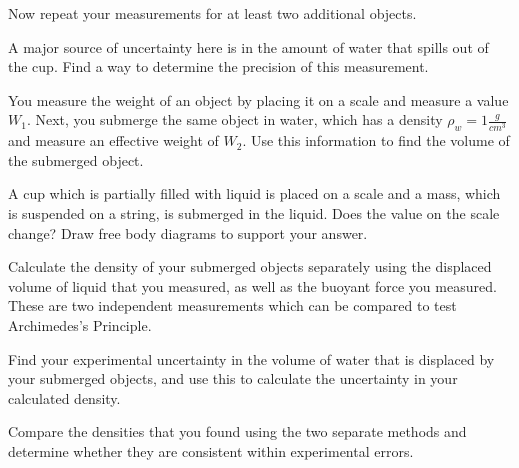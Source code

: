 Now repeat your measurements for at least two additional objects.

\selfcheck

A major source of uncertainty here is in the amount of water that spills out of the cup. Find a way to determine the precision of this measurement.

\prelab

\prelabquestion
You measure the weight of an object by placing it on a scale and measure a value $W_1$.  Next, you submerge the same object in water, which has a density $\rho_w=1 \frac{g}{cm^3}$ and measure an effective weight of $W_2$.  Use this information to find the volume of the submerged object.

\prelabquestion
A cup which is partially filled with liquid is placed on a scale and a mass, which is suspended on a string, is submerged in the liquid.  Does the value on the scale change?  Draw free body diagrams to support your answer.


\analysis

Calculate the density of your submerged objects separately  using the displaced volume of liquid that you measured, as well as the buoyant force you measured. These are two independent measurements which can be compared to test Archimedes's Principle.

Find your experimental uncertainty in the volume of water that is displaced by your submerged objects, and use this to calculate the uncertainty in your calculated density.

Compare the densities that you found using the two separate methods and determine whether they are consistent within experimental errors.
